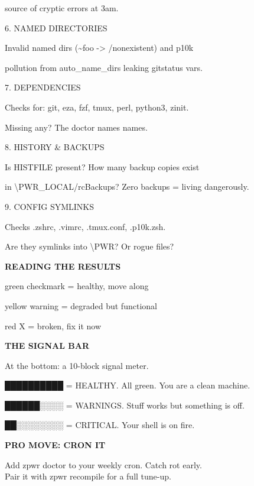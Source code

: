 \documentclass[11pt,a4paper,twoside]{book}
\begin{document}
source of cryptic errors at 3am.

6. NAMED DIRECTORIES

Invalid named dirs (\textasciitilde{}foo -> /nonexistent) and p10k

pollution from auto\_name\_dirs leaking gitstatus vars.

7. DEPENDENCIES

Checks for: git, eza, fzf, tmux, perl, python3, zinit.

Missing any? The doctor names names.

8. HISTORY \& BACKUPS

Is HISTFILE present? How many backup copies exist

in \textbackslash{}PWR\_LOCAL/rcBackups? Zero backups = living dangerously.

9. CONFIG SYMLINKS

Checks .zshrc, .vimrc, .tmux.conf, .p10k.zsh.

Are they symlinks into \textbackslash{}PWR? Or rogue files?


\vspace{12pt}
{\bfseries\color{neonyellow} READING THE RESULTS}\vspace{4pt}

green checkmark  = healthy, move along

yellow warning   = degraded but functional

red X            = broken, fix it now


\vspace{12pt}
{\bfseries\color{neonyellow} THE SIGNAL BAR}\vspace{4pt}

At the bottom: a 10-block signal meter.

██████████  = HEALTHY. All green. You are a clean machine.

██████░░░░  = WARNINGS. Stuff works but something is off.

██░░░░░░░░  = CRITICAL. Your shell is on fire.


\vspace{12pt}
{\bfseries\color{neonyellow} PRO MOVE: CRON IT}\vspace{4pt}

\begin{codebox}
Add zpwr doctor to your weekly cron. Catch rot early.\\
Pair it with zpwr recompile for a full tune-up.\\
\end{codebox}
\end{document}
